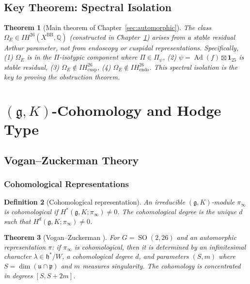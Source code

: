 \documentclass[12pt]{amsart}
\newtheorem{theorem}{Theorem}[section]
\newtheorem{definition}[theorem]{Definition}
\theoremstyle{definition}
\DeclareMathOperator\SO{SO}
\DeclareMathOperator\Ad{Ad}
\newcommand{\Q}{\mathbb{Q}}
\newcommand{\IH}{\mathit{IH}}
\begin{document}
\subsection{Key Theorem: Spectral Isolation}

\begin{theorem}[Main theorem of Chapter~\ref{sec:automorphic}]
The class $\Omega_E \in \IH^{26}(X^{\mathrm{BB}}, \Q)$ (constructed in Chapter~\ref{sec:gK}) arises from a stable residual Arthur parameter, not from endoscopy or cuspidal representations. Specifically, (1) $\Omega_E$ is in the $\Pi$-isotypic component where $\Pi \in \Pi_{\psi}$, (2) $\psi = \Ad(f) \boxtimes \mathbf{1}_{25}$ is stable residual, (3) $\Omega_E \notin \IH^{26}_{\mathrm{cusp}}$, (4) $\Omega_E \notin \IH^{26}_{\mathrm{endo}}$. This spectral isolation is the key to proving the obstruction theorem.
\end{theorem}

\section{$({\mathfrak g}, K)$-Cohomology and Hodge Type}
\label{sec:gK}

\subsection{Vogan--Zuckerman Theory}

\subsubsection{Cohomological Representations}

\begin{definition}[Cohomological representation]
An irreducible $({\mathfrak g}, K)$-module $\pi_{\infty}$ is \emph{cohomological} if $H^*({\mathfrak g}, K; \pi_{\infty}) \neq 0$. The cohomological degree is the unique $d$ such that $H^d({\mathfrak g}, K; \pi_{\infty}) \neq 0$.
\end{definition}

\begin{theorem}[Vogan--Zuckerman \cite{Vogan-Zuckerman}]
For $G = \SO(2, 26)$ and an automorphic representation $\pi$: if $\pi_{\infty}$ is cohomological, then it is determined by an infinitesimal character $\lambda \in {\mathfrak h}^*/W$, a cohomological degree $d$, and parameters $(S, m)$ where $S = \dim({\mathfrak u} \cap {\mathfrak p})$ and $m$ measures singularity. The cohomology is concentrated in degrees $[S, S + 2m]$.
\end{theorem}
\end{document}
